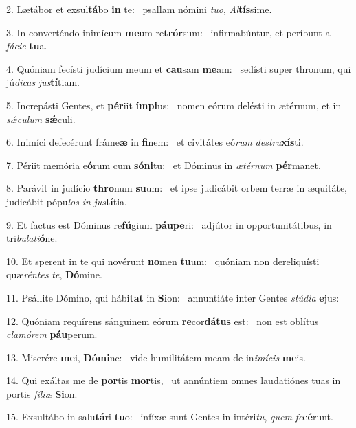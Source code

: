 2. Lætábor et exsul\textbf{tá}bo \textbf{in} te: \ast\  psallam nómini \textit{tu}\textit{o}, \textit{Al}\textbf{tís}sime.\

3. In converténdo inimícum \textbf{me}um re\textbf{trór}sum: \ast\  infirmabúntur, et períbunt a \textit{fá}\textit{ci}\textit{e} \textbf{tu}a.\

4. Quóniam fecísti judícium meum et \textbf{cau}sam \textbf{me}am: \ast\  sedísti super thronum, qui jú\textit{di}\textit{cas} \textit{jus}\textbf{tí}tiam.\

5. Increpásti Gentes, et \textbf{pér}iit \textbf{ím}\textbf{pi}us: \ast\  nomen eórum delésti in ætérnum, et in \textit{sǽ}\textit{cu}\textit{lum} \textbf{sǽ}culi.\

6. Inimíci defecérunt fráme\textbf{æ} in \textbf{fi}nem: \ast\  et civitátes eó\textit{rum} \textit{de}\textit{stru}\textbf{xís}ti.\

7. Périit memória e\textbf{ó}rum cum \textbf{só}\textbf{ni}tu: \ast\  et Dóminus in \textit{æ}\textit{tér}\textit{num} \textbf{pér}manet.\

8. Parávit in judício \textbf{thro}num \textbf{su}um: \ast\  et ipse judicábit orbem terræ in æquitáte, judicábit pópu\textit{los} \textit{in} \textit{jus}\textbf{tí}tia.\

9. Et factus est Dóminus re\textbf{fú}gium \textbf{páu}\textbf{pe}ri: \ast\  adjútor in opportunitátibus, in tri\textit{bu}\textit{la}\textit{ti}\textbf{ó}ne.\

10. Et sperent in te qui novérunt \textbf{no}men \textbf{tu}um: \ast\  quóniam non dereliquísti quæ\textit{rén}\textit{tes} \textit{te}, \textbf{Dó}mine.\

11. Psállite Dómino, qui hábi\textbf{tat} in \textbf{Si}on: \ast\  annuntiáte inter Gentes \textit{stú}\textit{di}\textit{a} \textbf{e}jus:\

12. Quóniam requírens sánguinem eórum \textbf{re}cor\textbf{dá}\textbf{tus} est: \ast\  non est oblítus \textit{cla}\textit{mó}\textit{rem} \textbf{páu}perum.\

13. Miserére \textbf{me}i, \textbf{Dó}\textbf{mi}ne: \ast\  vide humilitátem meam de in\textit{i}\textit{mí}\textit{cis} \textbf{me}is.\

14. Qui exáltas me de \textbf{por}tis \textbf{mor}tis, \ast\  ut annúntiem omnes laudatiónes tuas in portis \textit{fí}\textit{li}\textit{æ} \textbf{Si}on.\

15. Exsultábo in salu\textbf{tá}ri \textbf{tu}o: \ast\  infíxæ sunt Gentes in intéri\textit{tu}, \textit{quem} \textit{fe}\textbf{cé}runt.\

